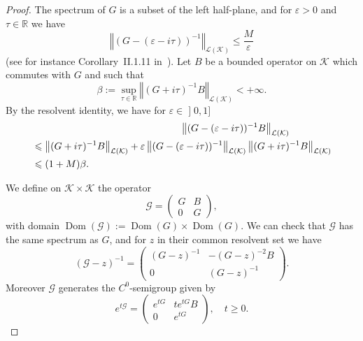 \documentclass[AHL,Unicode,longabstracts]{cedram}
\newcommand{\nr}[1]{\left\Vert #1\right\Vert}
\renewcommand{\leq}{\leqslant}
\renewcommand{\geq}{\geqslant}
\newcommand{\inv}{^{-1}}
\newcommand{\1}{\mathds 1}
\DeclareMathOperator{\Dom}{Dom}
\newcommand{\R}{\mathbb{R}}
\renewcommand{\b}{\beta}
\newcommand{\e}{\varepsilon}
\renewcommand{\t}{\tau}
\newcommand{\Gc}{{\mathcal G}}
\newcommand{\Kc}{{\mathcal K}}
\newcommand{\Lc}{{\mathcal L}}
\newcommand{\stepp}{\noindent {\bf $\bullet$}\quad }
\begin{document}
\begin{proof}
The spectrum of $G$ is a subset of the left half-plane, and for $\e > 0$ and $\t \in \R$ we have
\begin{equation}\label{estim-res-G}
\nr{(G-(\e-i\t))\inv}_{\Lc(\Kc)} \leq \frac M \e
\end{equation}
(see for instance Corollary~II.1.11 in~\cite{engel}). Let $B$ be a bounded operator on $\Kc$ which commutes with $G$ and such that
\[
\b := \sup_{\t \in \R} \nr{(G+i\t)^{-1} B}_{\Lc(\Kc)} < +\infty.
\]
By the resolvent identity, we have for $\e \in\mathopen{]}0,1]$
\begin{multline}\label{estim-resG-B}
\lefteqn{\nr{(G-(\e-i\t))\inv B}_{\Lc(\Kc)}}\\
\begin{aligned}
& \leq \nr{(G+i\t)\inv B}_{\Lc(\Kc)} + \e \nr{(G-(\e-i\t))\inv}_{\Lc(\Kc)}\nr{(G+i\t)\inv B}_{\Lc(\Kc)}\\
& \leq (1+M)\b.
\end{aligned}
\end{multline}

We define on $\Kc \times \Kc$ the operator
\[
\Gc =
\begin{pmatrix}
G & B \\
0 & G
\end{pmatrix},
\]
with domain $\Dom(\Gc) := \Dom(G) \times \Dom(G)$. We can check that $\Gc$ has the same spectrum as $G$, and for $z$ in their common resolvent set we have
\[
(\Gc - z)\inv =
\begin{pmatrix}
(G-z)\inv & -(G-z)^{-2} B \\
0 & (G-z)\inv
\end{pmatrix}.
\]
Moreover $\Gc$ generates the $C^0$-semigroup given by
\[
e^{t\Gc} =
\begin{pmatrix}
e^{tG} & t e^{tG} B \\
0 & e^{tG}
\end{pmatrix}, \quad t \geq 0.
\]


\end{proof}
\end{document}
